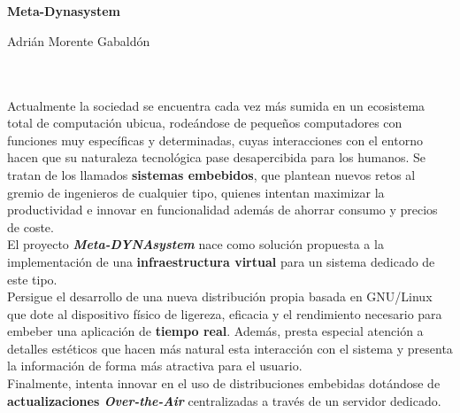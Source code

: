 \chapter*{}

\cleardoublepage
\thispagestyle{empty}

\begin{center}
	{\large\bfseries Meta-Dynasystem}\\
\end{center}
\begin{center}
	Adrián Morente Gabaldón\\
\end{center}

\\

\vspace{0.7cm}
\\

Actualmente la sociedad se encuentra cada vez más sumida en un ecosistema total de computación ubicua, rodeándose de pequeños computadores con funciones muy específicas y determinadas, cuyas interacciones con el entorno hacen que su naturaleza tecnológica pase desapercibida para los humanos. Se tratan de los llamados \textbf{sistemas embebidos}, que plantean nuevos retos al gremio de ingenieros de cualquier tipo, quienes intentan maximizar la productividad e innovar en funcionalidad además de ahorrar consumo y precios de coste.\\

El proyecto \textit{\textbf{Meta-DYNAsystem}} nace como solución propuesta a la implementación de una \textbf{infraestructura virtual} para un sistema dedicado de este tipo.\\

Persigue el desarrollo de una nueva distribución propia basada en GNU/Linux que dote al dispositivo físico de ligereza, eficacia y el rendimiento necesario para embeber una aplicación de \textbf{tiempo real}. Además, presta especial atención a detalles estéticos que hacen más natural esta interacción con el sistema y presenta la información de forma más atractiva para el usuario.\\

Finalmente, intenta innovar en el uso de distribuciones embebidas dotándose de \textbf{actualizaciones \textit{Over-the-Air}} centralizadas a través de un servidor dedicado.\\

